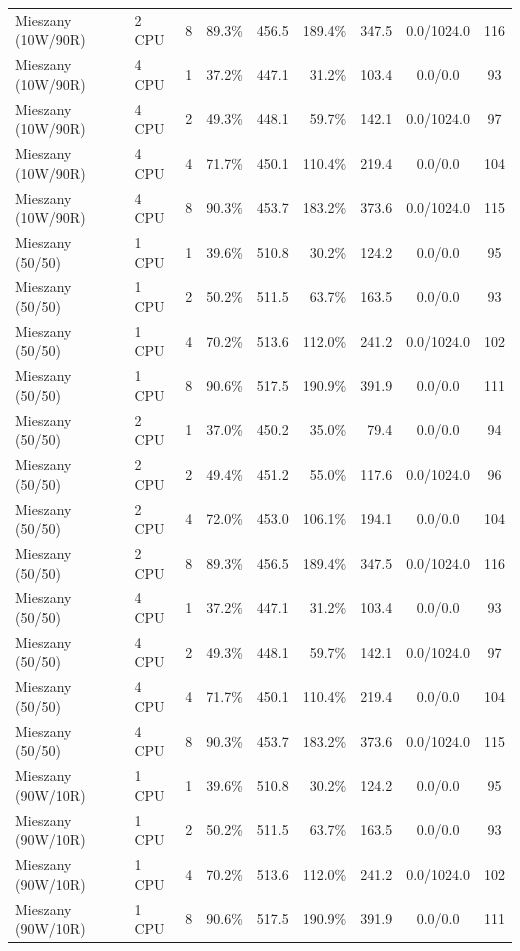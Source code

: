\begin{table}[ht]
{\begin{tabular}{llcrrrrcc}
Mieszany (10W/90R) & 2 CPU & 8 & 89.3\% & 456.5 & 189.4\% & 347.5 & 0.0/1024.0 & 116 \\
Mieszany (10W/90R) & 4 CPU & 1 & 37.2\% & 447.1 & 31.2\% & 103.4 & 0.0/0.0 & 93 \\
Mieszany (10W/90R) & 4 CPU & 2 & 49.3\% & 448.1 & 59.7\% & 142.1 & 0.0/1024.0 & 97 \\
Mieszany (10W/90R) & 4 CPU & 4 & 71.7\% & 450.1 & 110.4\% & 219.4 & 0.0/0.0 & 104 \\
Mieszany (10W/90R) & 4 CPU & 8 & 90.3\% & 453.7 & 183.2\% & 373.6 & 0.0/1024.0 & 115 \\
Mieszany (50/50) & 1 CPU & 1 & 39.6\% & 510.8 & 30.2\% & 124.2 & 0.0/0.0 & 95 \\
Mieszany (50/50) & 1 CPU & 2 & 50.2\% & 511.5 & 63.7\% & 163.5 & 0.0/0.0 & 93 \\
Mieszany (50/50) & 1 CPU & 4 & 70.2\% & 513.6 & 112.0\% & 241.2 & 0.0/1024.0 & 102 \\
Mieszany (50/50) & 1 CPU & 8 & 90.6\% & 517.5 & 190.9\% & 391.9 & 0.0/0.0 & 111 \\
Mieszany (50/50) & 2 CPU & 1 & 37.0\% & 450.2 & 35.0\% & 79.4 & 0.0/0.0 & 94 \\
Mieszany (50/50) & 2 CPU & 2 & 49.4\% & 451.2 & 55.0\% & 117.6 & 0.0/1024.0 & 96 \\
Mieszany (50/50) & 2 CPU & 4 & 72.0\% & 453.0 & 106.1\% & 194.1 & 0.0/0.0 & 104 \\
Mieszany (50/50) & 2 CPU & 8 & 89.3\% & 456.5 & 189.4\% & 347.5 & 0.0/1024.0 & 116 \\
Mieszany (50/50) & 4 CPU & 1 & 37.2\% & 447.1 & 31.2\% & 103.4 & 0.0/0.0 & 93 \\
Mieszany (50/50) & 4 CPU & 2 & 49.3\% & 448.1 & 59.7\% & 142.1 & 0.0/1024.0 & 97 \\
Mieszany (50/50) & 4 CPU & 4 & 71.7\% & 450.1 & 110.4\% & 219.4 & 0.0/0.0 & 104 \\
Mieszany (50/50) & 4 CPU & 8 & 90.3\% & 453.7 & 183.2\% & 373.6 & 0.0/1024.0 & 115 \\
Mieszany (90W/10R) & 1 CPU & 1 & 39.6\% & 510.8 & 30.2\% & 124.2 & 0.0/0.0 & 95 \\
Mieszany (90W/10R) & 1 CPU & 2 & 50.2\% & 511.5 & 63.7\% & 163.5 & 0.0/0.0 & 93 \\
Mieszany (90W/10R) & 1 CPU & 4 & 70.2\% & 513.6 & 112.0\% & 241.2 & 0.0/1024.0 & 102 \\
Mieszany (90W/10R) & 1 CPU & 8 & 90.6\% & 517.5 & 190.9\% & 391.9 & 0.0/0.0 & 111 \\

\end{tabular}}
\end{table}

